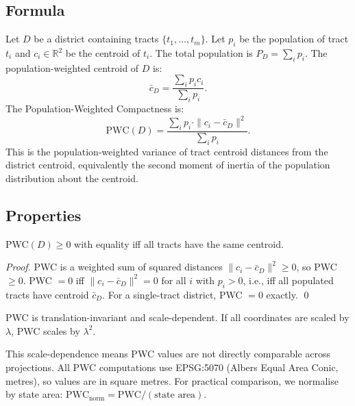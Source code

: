 \subsection{Formula}

Let $D$ be a district containing tracts $\{t_1, \ldots, t_m\}$.
Let $p_i$ be the population of tract $t_i$ and $c_i \in \mathbb{R}^2$ be
the centroid of $t_i$.
The total population is $P_D = \sum_i p_i$.
The population-weighted centroid of $D$ is:
\begin{equation}
  \bar{c}_D = \frac{\sum_i p_i c_i}{\sum_i p_i}.
  \label{eq:centroid}
\end{equation}
The Population-Weighted Compactness is:
\begin{equation}
  \text{PWC}(D) = \frac{\sum_i p_i \cdot \|c_i - \bar{c}_D\|^2}{\sum_i p_i}.
  \label{eq:pwc}
\end{equation}
This is the population-weighted variance of tract centroid distances from
the district centroid, equivalently the second moment of inertia of the
population distribution about the centroid.

\subsection{Properties}

\begin{proposition}
  PWC$(D) \geq 0$ with equality iff all tracts have the same centroid.
\end{proposition}

\begin{proof}
  PWC is a weighted sum of squared distances $\|c_i - \bar{c}_D\|^2 \geq 0$,
  so PWC $\geq 0$.
  PWC $= 0$ iff $\|c_i - \bar{c}_D\|^2 = 0$ for all $i$ with $p_i > 0$,
  i.e., iff all populated tracts have centroid $\bar{c}_D$.
  For a single-tract district, PWC $= 0$ exactly. \qed
\end{proof}

\begin{proposition}
  PWC is translation-invariant and scale-dependent.
  If all coordinates are scaled by $\lambda$, PWC scales by $\lambda^2$.
\end{proposition}

This scale-dependence means PWC values are not directly comparable across
projections.
All PWC computations use EPSG:5070 (Albers Equal Area Conic, metres),
so values are in square metres.
For practical comparison, we normalise by state area:
$\text{PWC}_{\text{norm}} = \text{PWC} / (\text{state area})$.

